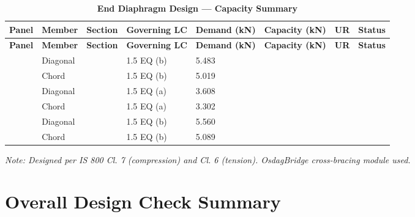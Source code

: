 \documentclass[12pt,a4paper]{report}
\numberwithin{table}{chapter}
\numberwithin{figure}{chapter}
\begin{document}
\begin{longtable}{|C{2.0cm}|L{1.8cm}|C{2.2cm}|C{3.0cm}|C{1.8cm}|C{1.8cm}|C{1.2cm}|C{1.8cm}|}
\caption{\textbf{End Diaphragm Design --- Capacity Summary}}
\hline
{} \textbf{Panel} & \textbf{Member} & \textbf{Section} & \textbf{Governing LC} & \textbf{Demand (kN)} & \textbf{Capacity (kN)} & \textbf{UR} & \textbf{Status} \\[6pt]
\hline
\endfirsthead
\hline
{} \textbf{Panel} & \textbf{Member} & \textbf{Section} & \textbf{Governing LC} & \textbf{Demand (kN)} & \textbf{Capacity (kN)} & \textbf{UR} & \textbf{Status} \\[6pt]
\hline
\endhead
{} & Diagonal &  & 1.5 EQ (b) & 5.483 &  &  &  \\[6pt]
 & Chord &  & 1.5 EQ (b) & 5.019 &  &  &  \\[6pt]
\hline
{} & Diagonal &  & 1.5 EQ (a) & 3.608 &  &  &  \\[6pt]
 & Chord &  & 1.5 EQ (a) & 3.302 &  &  &  \\[6pt]
\hline
{} & Diagonal &  & 1.5 EQ (b) & 5.560 &  &  &  \\[6pt]
 & Chord &  & 1.5 EQ (b) & 5.089 &  &  &  \\[6pt]
\hline
\end{longtable}
\noindent\textit{Note: Designed per IS 800 Cl. 7 (compression) and Cl. 6 (tension). OsdagBridge cross-bracing module used.}

\section{Overall Design Check Summary}
\label{sec:overall-summary}
\end{document}
